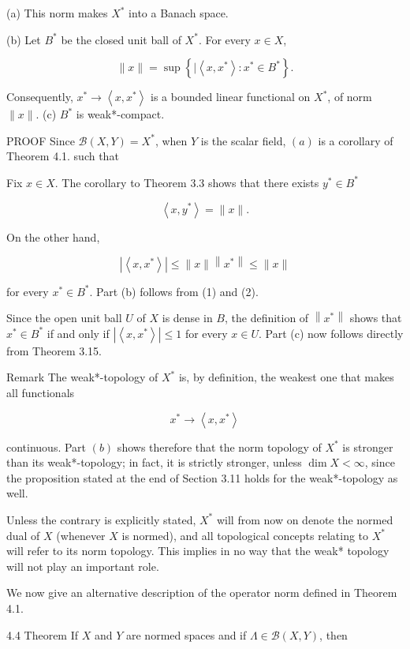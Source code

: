 \documentclass[10pt]{article}
\begin{document}
(a) This norm makes $X^{*}$ into a Banach space.

(b) Let $B^{*}$ be the closed unit ball of $X^{*}$. For every $x \in X$,

$$
\|x\|=\sup \left\{\mid\left\langle x, x^{*}\right\rangle: x^{*} \in B^{*}\right\} .
$$

Consequently, $x^{*} \rightarrow\left\langle x, x^{*}\right\rangle$ is a bounded linear functional on $X^{*}$, of norm $\|x\|$.
(c) $B^{*}$ is weak*-compact.

PROOF Since $\mathscr{B}(X, Y)=X^{*}$, when $Y$ is the scalar field, $(a)$ is a corollary of Theorem 4.1. such that

Fix $x \in X$. The corollary to Theorem 3.3 shows that there exists $y^{*} \in B^{*}$

$$
\left\langle x, y^{*}\right\rangle=\|x\| .
$$

On the other hand,

$$
\left|\left\langle x, x^{*}\right\rangle\right| \leq\|x\|\left\|x^{*}\right\| \leq\|x\|
$$

for every $x^{*} \in B^{*}$. Part (b) follows from (1) and (2).

Since the open unit ball $U$ of $X$ is dense in $B$, the definition of $\left\|x^{*}\right\|$ shows that $x^{*} \in B^{*}$ if and only if $\left|\left\langle x, x^{*}\right\rangle\right| \leq 1$ for every $x \in U$. Part (c) now follows directly from Theorem 3.15.

Remark The weak*-topology of $X^{*}$ is, by definition, the weakest one that makes all functionals

$$
x^{*} \rightarrow\left\langle x, x^{*}\right\rangle
$$

continuous. Part $(b)$ shows therefore that the norm topology of $X^{*}$ is stronger than its weak*-topology; in fact, it is strictly stronger, unless $\operatorname{dim} X<\infty$, since the proposition stated at the end of Section 3.11 holds for the weak*-topology as well.

Unless the contrary is explicitly stated, $X^{*}$ will from now on denote the normed dual of $X$ (whenever $X$ is normed), and all topological concepts relating to $X^{*}$ will refer to its norm topology. This implies in no way that the weak* topology will not play an important role.

We now give an alternative description of the operator norm defined in Theorem 4.1.

4.4 Theorem If $X$ and $Y$ are normed spaces and if $\Lambda \in \mathscr{B}(X, Y)$, then
\end{document}
